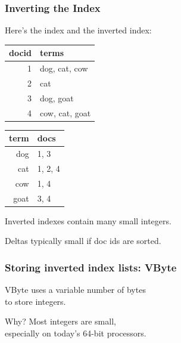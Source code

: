 \begin{frame}
\frametitle{Inverting the Index}

\large\begin{changemargin}{2cm}
Here's the index and the inverted index:
\begin{center}
\begin{tabular}{r|l}
docid & terms \\ \hline
1 & dog, cat, cow\\
2 & cat\\
3 & dog, goat\\
4 & cow, cat, goat\\
\end{tabular} \hspace*{2em}
\begin{tabular}{r|l}
term & docs \\ \hline
dog & 1, 3 \\
cat & 1, 2, 4 \\
cow & 1, 4 \\
goat & 3, 4
\end{tabular}
\end{center}

Inverted indexes contain many small integers.

Deltas typically small if doc ids are sorted.
\end{changemargin}

\end{frame}


\begin{frame}
\frametitle{Storing inverted index lists: VByte}

\Large\begin{changemargin}{2cm}
\vspace*{-2em}
VByte uses a variable number of bytes\\
to store integers.  

Why? Most integers are
small,\\
especially on today's 64-bit processors.
\end{changemargin}
\end{frame}


